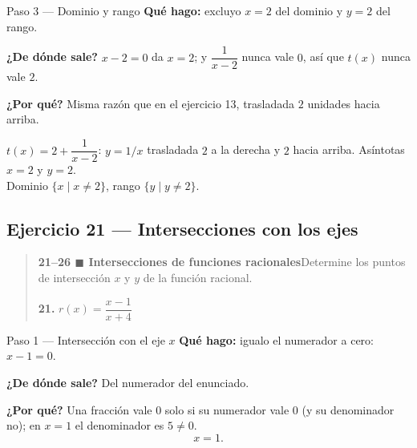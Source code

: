 \documentclass[11pt]{article}
\begin{document}
\begin{paso}{Paso 3 --- Dominio y rango}
\textbf{Qué hago:} excluyo $x=2$ del dominio y $y=2$ del rango.

\textbf{¿De dónde sale?} $x-2=0$ da $x=2$; y $\dfrac{1}{x-2}$ nunca vale $0$, así que $t(x)$ nunca vale $2$.

\textbf{¿Por qué?} Misma razón que en el ejercicio 13, trasladada $2$ unidades hacia arriba.
\end{paso}

\begin{center}
\end{center}

\begin{resp}
$t(x)=2+\dfrac{1}{x-2}$: $y=1/x$ trasladada $2$ a la derecha y $2$ hacia arriba. Asíntotas $x=2$ y $y=2$.\\
Dominio $\{x\mid x\ne 2\}$, rango $\{y\mid y\ne 2\}$.
\end{resp}

\subsection*{Ejercicio 21 — Intersecciones con los ejes}

\begin{quote}
\textbf{21--26 $\blacksquare$ Intersecciones de funciones racionales}\quad Determine los puntos de intersección $x$ y $y$ de la función racional.

\textbf{21.} $r(x)=\dfrac{x-1}{x+4}$
\end{quote}

\begin{paso}{Paso 1 --- Intersección con el eje $x$}
\textbf{Qué hago:} igualo el numerador a cero: $x-1=0$.

\textbf{¿De dónde sale?} Del numerador del enunciado.

\textbf{¿Por qué?} Una fracción vale $0$ solo si su numerador vale $0$ (y su denominador no); en $x=1$ el denominador es $5\ne 0$.
\[
x=1 .
\]
\end{paso}
\end{document}
